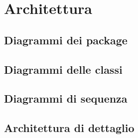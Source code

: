 \section{Architettura}

\subsection{Diagrammi dei package}

\subsection{Diagrammi delle classi}

\subsection{Diagrammi di sequenza}

\subsection{Architettura di dettaglio}
